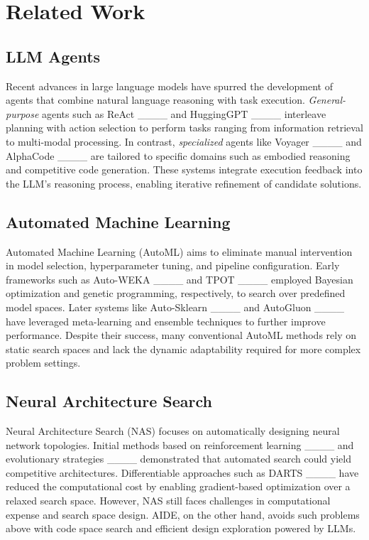 \section{Related Work}
\subsection{LLM Agents}
Recent advances in large language models have spurred the development of agents that combine natural language reasoning with task execution. \emph{General-purpose} agents such as ReAct ____ and HuggingGPT ____ interleave planning with action selection to perform tasks ranging from information retrieval to multi-modal processing. In contrast, \emph{specialized} agents like Voyager ____ and AlphaCode ____ are tailored to specific domains such as embodied reasoning and competitive code generation. These systems integrate execution feedback into the LLM's reasoning process, enabling iterative refinement of candidate solutions.

\subsection{Automated Machine Learning}
Automated Machine Learning (AutoML) aims to eliminate manual intervention in model selection, hyperparameter tuning, and pipeline configuration. Early frameworks such as Auto-WEKA ____ and TPOT ____ employed Bayesian optimization and genetic programming, respectively, to search over predefined model spaces. Later systems like Auto-Sklearn ____ and AutoGluon ____ have leveraged meta-learning and ensemble techniques to further improve performance. Despite their success, many conventional AutoML methods rely on static search spaces and lack the dynamic adaptability required for more complex problem settings.

\subsection{Neural Architecture Search}
Neural Architecture Search (NAS) focuses on automatically designing neural network topologies. Initial methods based on reinforcement learning ____ and evolutionary strategies ____ demonstrated that automated search could yield competitive architectures. Differentiable approaches such as DARTS ____ have reduced the computational cost by enabling gradient-based optimization over a relaxed search space. However, NAS still faces challenges in computational expense and search space design. 
AIDE, on the other hand, avoids such problems above with code space search and efficient design exploration powered by LLMs.